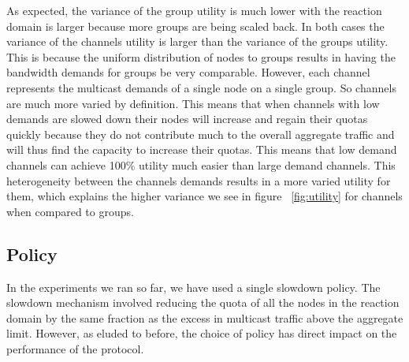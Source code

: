 As expected, the variance of the group utility is much lower with the reaction domain is larger because more groups are being scaled back. In both cases the variance of the channels utility is larger than the variance of the groups utility. This is because the uniform distribution of nodes to groups results in having the bandwidth demands for groups be very comparable. However, each channel represents the multicast demands of a single node on a single group. So channels are much more varied by definition. This means that when channels with low demands are slowed down their nodes will increase and regain their quotas quickly because they do not contribute much to the overall aggregate traffic and will thus find the capacity to increase their quotas. This means that low demand channels can achieve 100\% utility much easier than large demand channels. This heterogeneity between the channels demands results in a more varied utility for them, which explains the higher variance we see in figure ~\ref{fig:utility} for channels when compared to groups.


\subsection{Policy}
In the experiments we ran so far, we have used a single slowdown policy. The slowdown mechanism involved reducing the quota of all the nodes in the reaction domain by the same fraction as the excess in multicast traffic above the aggregate limit. However, as eluded to before, the choice of policy has direct impact on the performance of the protocol.

